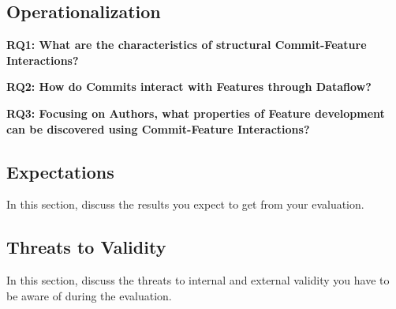 \subsection*{Operationalization}\label{sec:operationalization}

\textbf{RQ1: What are the characteristics of structural Commit-Feature Interactions?}

\textbf{RQ2: How do Commits interact with Features through Dataflow?}

\textbf{RQ3: Focusing on Authors, what properties of Feature development can be discovered using Commit-Feature Interactions?}

\subsection*{Expectations}\label{sec:expectations}

In this section, discuss the results you expect to get from your evaluation.

\subsection*{Threats to Validity}\label{sec:threats}

In this section, discuss the threats to internal and external validity you have to be aware of during the evaluation.
